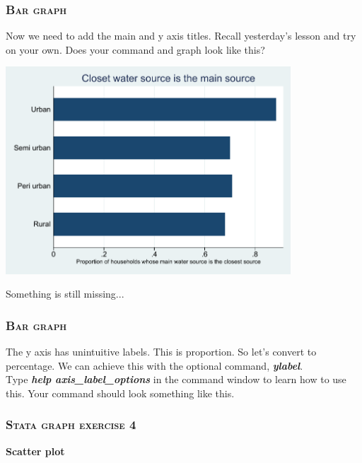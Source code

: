 \documentclass[10pt]{beamer}
\begin{document}
	\begin{frame}
	\frametitle{\textsc{Bar graph}}	
		 Now we need to add the main and y axis titles.
					 Recall yesterday's lesson and try on your own. \vspace{1mm}
		\onslide<2-> Does your command and graph look like this?
		
\begin{center}
    \includegraphics[width=0.8\textwidth]{bar_2.pdf}
\end{center}
			\vspace{1mm}
		 Something is still missing...
	\end{frame}

	\begin{frame}
	\frametitle{\textsc{Bar graph}}	
		 The y axis has unintuitive labels. This is proportion.
					 So let's convert to percentage. We can achieve this with 
					 the optional command, \textbf{\textit{ylabel}}. \\
		\vspace{1mm}			 
					 Type \textbf{\textit{help axis\_label\_options}} in the
					 command window to learn how to use this. 
		\vspace{1mm}
		\onslide<2-> Your command should look something like this. 
	
\begin{stlog}\end{stlog}
	\end{frame}
	
	\begin{frame}
	\frametitle{\textsc{Stata graph exercise 4}}
		\begin{center}
		\Large \textbf{Scatter plot}
		\end{center}
	\end{frame}		
	
\end{document}
